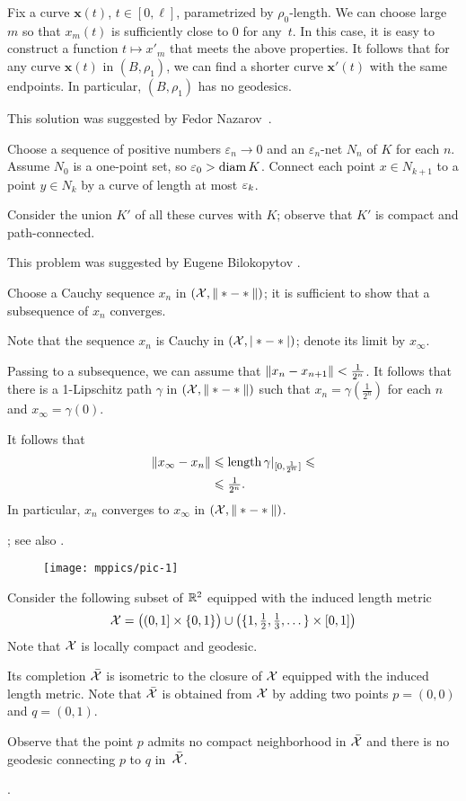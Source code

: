 Fix a curve $\bm{x}(t)$, $t\in[0,\ell]$, parametrized by  $\rho_0$-length.
We can choose large $m$ so that $x_m(t)$ is sufficiently close to $0$ for any~$t$.
In this case, it is easy to construct a function $t\mapsto x'_m$ that meets the above properties.
It follows that for any curve $\bm{x}(t)$ in $(B,\rho_1)$, we can find a shorter curve $\bm{x}'(t)$ with the same endpoints.
In particular, $(B,\rho_1)$ has no geodesics.

This solution was suggested by Fedor Nazarov~\cite{nazarov}.

Choose a sequence of positive numbers $\varepsilon_n\to 0$ and an $\varepsilon_n$-net $N_n$ of $K$ for each $n$.
Assume $N_0$ is a one-point set, so $\varepsilon_0>\operatorname{\rm diam}\nolimits K$.
Connect each point $x\in N_{k+1}$ to a point $y\in N_{k}$ by a curve of length at most $\varepsilon_k$.

Consider the union $K'$ of all these curves with $K$; observe that $K'$ is compact and path-connected.

 This problem was suggested by Eugene Bilokopytov \cite{bilokopytov}.

Choose a Cauchy sequence $x_n$ in $(\mathcal{X},\|*-*\|)$; it is sufficient to show that a subsequence of $x_n$ converges.

Note that the sequence $x_n$ is Cauchy in $(\mathcal{X},|*-*|)$;
denote its limit by $x_\infty$.

Passing to a subsequence, we can assume that $\|x_n-x_{n+1}\|\z<\tfrac1{2^n}$.
It follows that there is a 1-Lipschitz path $\gamma$ in $(\mathcal{X},\|*-*\|)$ such that $x_n=\gamma(\tfrac1{2^n})$ for each $n$ and $x_\infty=\gamma(0)$.

It follows that
\begin{align*}
\|x_\infty-x_n\|&\leqslant \mathop{\rm length}\nolimits\gamma|_{[0,\frac1{2^n}]}\leqslant
\\
&\leqslant \tfrac1{2^n}.
\end{align*}
In particular, $x_n$ converges to $x_\infty$ in $(\mathcal{X},\|*-*\|)$.

 \cite[Corollary]{hu-kirk}; see also \cite[Lemma 2.3]{petrunin-stadler}.


\begin{wrapfigure}{r}{20 mm}
\vskip-5mm
\centering
\texttt{[image: mppics/pic-1]}
\end{wrapfigure}

Consider the following subset of $\mathbb{R}^2$ equipped with the induced length metric
\[
\mathcal{X}
=
\bigl((0,1]\times\{0,1\}\bigr)
\cup
\bigl(\{1,\tfrac12,\tfrac13,\dots\}\times[0,1]\bigr)
\]
Note that $\mathcal{X}$ is locally compact and geodesic.

Its completion $\bar{\mathcal{X}}$ is isometric to the closure of $\mathcal{X}$ equipped with the induced length metric.
Note that $\bar{\mathcal{X}}$ is obtained from $\mathcal{X}$ by adding two points $p=(0,0)$ and $q=(0,1)$.

Observe that the point $p$ admits no compact neighborhood in $\bar{\mathcal{X}}$ 
and there is no geodesic connecting $p$ to $q$ in~$\bar{\mathcal{X}}$. 

 \cite[I.3.6(4)]{bridson-haefliger}.

